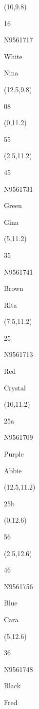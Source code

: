 \documentclass[a4paper]{article}
\newcommand{\myseat}[4]{%
\vspace{-0.1cm}
\parbox[t][2.2cm][t]{3.5cm}{
\small #1 %
\begin{description}
\vspace{-0.1cm}
\item [ID:] #2
\vspace{-0.1cm}
\item [Team:] #3 \normalsize
\vspace{-0.1cm}
\item \normalsize #4
\vspace{-0.1cm}
\end{description}
}
}
\begin{document}
\begin{CJK}{UTF8}{cyberbit}
\begin{textblock}{2.5}(10,9.8)
\myseat{16}{N9561717}{White}{Nina}
\end{textblock}

\begin{textblock}{2.5}(12.5,9.8)
\textblockcolor{}
\myseat{08}{}{}{}
\end{textblock}

\begin{textblock}{2.5}(0,11.2)
\textblockcolor{}
\myseat{55}{}{}{}
\end{textblock}

\begin{textblock}{2.5}(2.5,11.2)
\myseat{45}{N9561731}{Green}{Gina}
\end{textblock}

\begin{textblock}{2.5}(5,11.2)
\myseat{35}{N9561741}{Brown}{Rita}
\end{textblock}

\begin{textblock}{2.5}(7.5,11.2)
\myseat{25}{N9561713}{Red}{Crystal}
\end{textblock}

\begin{textblock}{2.5}(10,11.2)
\myseat{25a}{N9561709}{Purple}{Abbie}
\end{textblock}

\begin{textblock}{2.5}(12.5,11.2)
\textblockcolor{}
\myseat{25b}{}{}{}
\end{textblock}

\begin{textblock}{2.5}(0,12.6)
\textblockcolor{}
\myseat{56}{}{}{}
\end{textblock}

\begin{textblock}{2.5}(2.5,12.6)
\myseat{46}{N9561756}{Blue}{Cara}
\end{textblock}

\begin{textblock}{2.5}(5,12.6)
\myseat{36}{N9561748}{Black}{Fred}
\end{textblock}


\end{CJK}
\end{document}
